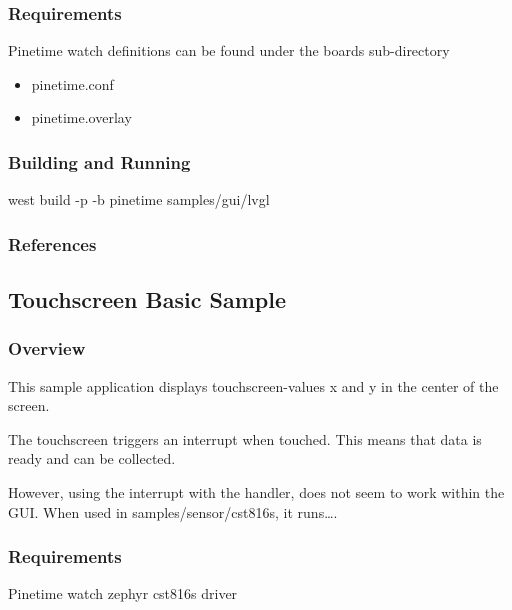 \documentclass[letterpaper,10pt,english]{sphinxmanual}
\begin{document}
\subsubsection{Requirements}
\label{\detokenize{samples/gui/lvgl/README:requirements}}
Pinetime watch
definitions can be found under the boards sub-directory
\begin{itemize}
\item {} 
pinetime.conf

\item {} 
pinetime.overlay

\end{itemize}


\subsubsection{Building and Running}
\label{\detokenize{samples/gui/lvgl/README:building-and-running}}
west build -p -b pinetime samples/gui/lvgl


\subsubsection{References}
\label{\detokenize{samples/gui/lvgl/README:references}}

\subsection{Touchscreen Basic Sample}
\label{\detokenize{samples/gui/lvtouch/README:touchscreen-basic-sample}}\label{\detokenize{samples/gui/lvtouch/README:touchscreen-sample}}\label{\detokenize{samples/gui/lvtouch/README::doc}}

\subsubsection{Overview}
\label{\detokenize{samples/gui/lvtouch/README:overview}}
This sample application displays touchscreen-values x and y in the center of the screen.

The touchscreen triggers an interrupt when touched.
This means that data is ready and can be collected.

However, using the interrupt with the handler, does not seem to work within the GUI.
When used in samples/sensor/cst816s, it runs….


\subsubsection{Requirements}
\label{\detokenize{samples/gui/lvtouch/README:requirements}}
Pinetime watch
zephyr cst816s driver
\end{document}
